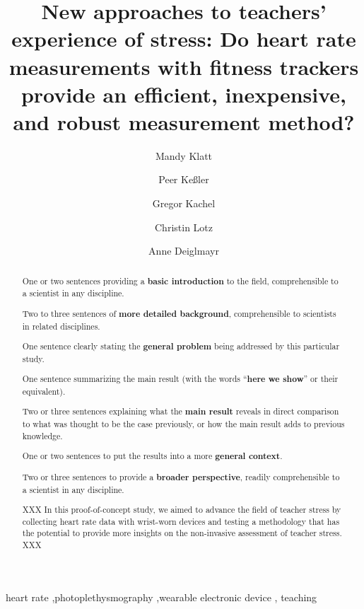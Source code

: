 \documentclass[preprint, 3p,
authoryear]{elsarticle} %
\begin{document}
\begin{frontmatter}

  \title{New approaches to teachers' experience of stress: Do heart rate
measurements with fitness trackers provide an efficient, inexpensive,
and robust measurement method?}
    \author[Leipzig University]{Mandy Klatt%
  }
    \author[Leipzig University]{Peer Keßler%
  }
    \author[Leipzig University, Max Planck Institute for Evolutionary
Anthropology]{Gregor Kachel%
  }
    \author[Leipzig University]{Christin Lotz%
  }
    \author[Leipzig University]{Anne Deiglmayr%
  }
  
  \begin{abstract}
  One or two sentences providing a \textbf{basic introduction} to the
  field, comprehensible to a scientist in any discipline.

  Two to three sentences of \textbf{more detailed background},
  comprehensible to scientists in related disciplines.

  One sentence clearly stating the \textbf{general problem} being
  addressed by this particular study.

  One sentence summarizing the main result (with the words
  ``\textbf{here we show}'' or their equivalent).

  Two or three sentences explaining what the \textbf{main result}
  reveals in direct comparison to what was thought to be the case
  previously, or how the main result adds to previous knowledge.

  One or two sentences to put the results into a more \textbf{general
  context}.

  Two or three sentences to provide a \textbf{broader perspective},
  readily comprehensible to a scientist in any discipline.

  XXX In this proof-of-concept study, we aimed to advance the field of
  teacher stress by collecting heart rate data with wrist-worn devices
  and testing a methodology that has the potential to provide more
  insights on the non-invasive assessment of teacher stress. XXX
  \end{abstract}
    \begin{keyword}
    heart rate \sep photoplethysmography \sep wearable electronic
device \sep 
    teaching
  \end{keyword}
  
 \end{frontmatter}
\end{document}
